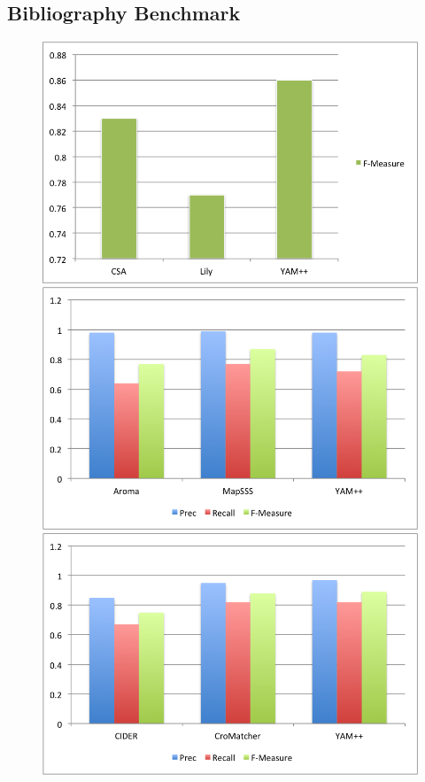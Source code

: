 \documentclass[11pt,titlepage,oneside,openany,a4paper]{report}
\begin{document}
\subsection{Bibliography Benchmark}
\begin{figure}
 \includegraphics[scale=.5]{figures/oaei/benchmark/top2011.png} 
 \includegraphics[scale=.5]{figures/oaei/benchmark/top2012.png}
 \includegraphics[scale=.5]{figures/oaei/benchmark/top2013.png}  

\end{figure}
\end{document}
